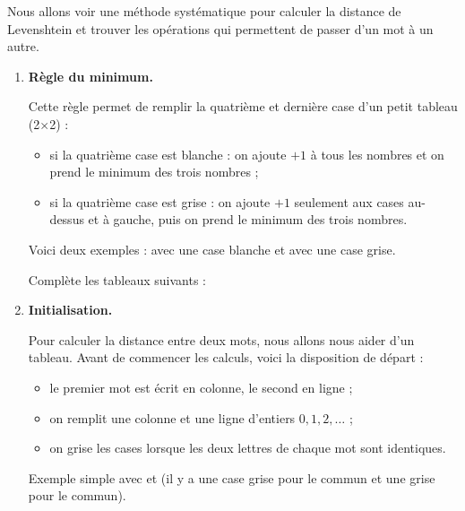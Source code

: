 \documentclass[class=report,crop=false, 12pt]{standalone}
\begin{document}
\begin{activite}

Nous allons voir une méthode systématique pour calculer la distance de Levenshtein et trouver les opérations qui permettent de passer d'un mot à un autre.


\begin{enumerate}

\item \textbf{Règle du minimum.}

Cette règle permet de remplir la quatrième et dernière case d'un petit tableau (2$\times$2) :
\begin{itemize}
  \item si la quatrième case est blanche : on ajoute $+1$ à tous les nombres et on prend le minimum des trois nombres ;
  
  \item si la quatrième case est grise : on ajoute $+1$ seulement aux cases au-dessus et à gauche, puis on prend le minimum des trois nombres.
\end{itemize}


Voici deux exemples : avec une case blanche et avec une case grise.



Complète les tableaux suivants :



\item \textbf{Initialisation.}

Pour calculer la distance entre deux mots, nous allons nous aider d'un tableau. Avant de commencer les calculs, voici la disposition de départ :

\begin{itemize}
  \item le premier mot est écrit en colonne, le second en ligne ;
  \item on remplit une colonne et une ligne d'entiers $0,1,2,\ldots$ ;
  \item on grise les cases lorsque les deux lettres de chaque mot sont identiques.
\end{itemize}

Exemple simple avec  et  (il y a une case grise pour le  commun et une grise pour le  commun).



\end{enumerate}
\end{activite}
\end{document}
